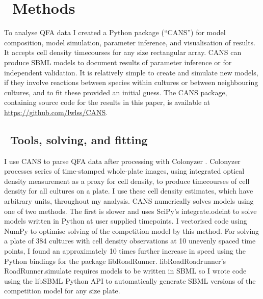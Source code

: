 \graphicspath{{images/}}

\section{\thesection~Methods}
\label{sec:methods}

To analyse QFA data I created a Python package (``CANS'') for model
composition, model simulation, parameter inference, and visualisation
of results. It accepts cell density timecourses for any size
rectangular array. CANS can produce SBML models to document results of
parameter inference or for independent validation. It is relatively
simple to create and simulate new models, if they involve reactions
between species within cultures or between neighbouring cultures, and
to fit these provided an initial guess. The CANS package, containing
source code for the results in this paper, is available at
\href{https://github.com/lwlss/CANS}{https://github.com/lwlss/CANS}.

\subsection{\thesubsection~Tools, solving, and fitting}


I use CANS to parse QFA data after processing with Colonyzer
\citep{Lawless2010}. Colonyzer processes series of time-stamped
whole-plate images, using integrated optical density measurement as a
proxy for cell density, to produce timecourses of cell density for all
cultures on a plate. I use these cell density estimates, which have
arbitrary units, throughout my analysis. CANS numerically solves
models using one of two methods. The first is slower and uses SciPy's
integrate.odeint to solve models written in Python at user supplied
timepoints. I vectorised code using NumPy to optimise solving of the
competition model by this method. For solving a plate of 384 cultures
with cell density observations at 10 unevenly spaced time points, I
found an approximately 10 times further increase in speed using the
Python bindings for the package libRoadRunner. libRoadRoadrunner's
RoadRunner.simulate requires models to be written in SBML so I wrote
code using the libSBML Python API to automatically generate SBML
versions of the competition model for any size plate.

